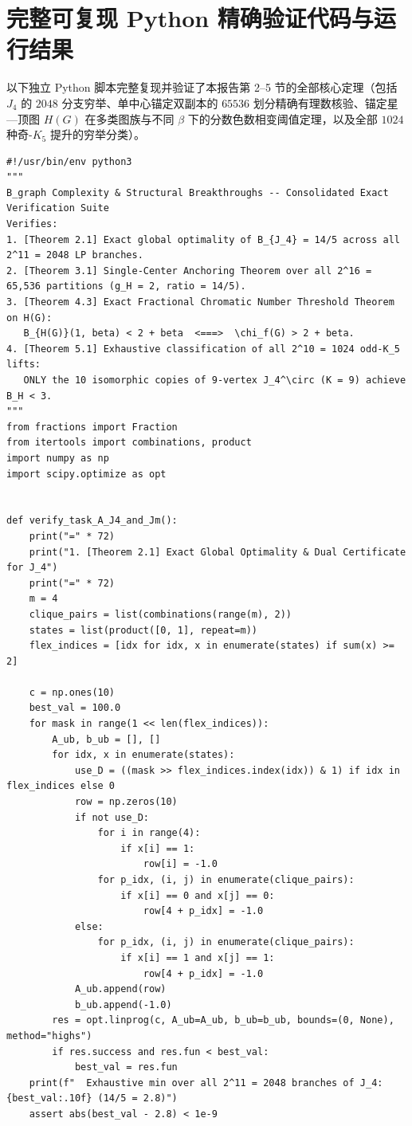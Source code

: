 \documentclass[11pt,a4paper]{ctexart}
\theoremstyle{definition}
\newcommand{\1}{\boldsymbol 1}
\newcommand{\0}{\boldsymbol 0}
\begin{document}
\newpage
\appendix
\section{完整可复现 Python 精确验证代码与运行结果}

以下独立 Python 脚本完整复现并验证了本报告第 2--5 节的全部核心定理（包括 $J_4$ 的 $2048$ 分支穷举、单中心锚定双副本的 $65536$ 划分精确有理数核验、锚定星—顶图 $H(G)$ 在多类图族与不同 $\beta$ 下的分数色数相变阈值定理，以及全部 $1024$ 种奇-$K_5$ 提升的穷举分类）。

\begin{lstlisting}[style=pycode,caption={一般 $B_{\rm graph}$ 核心定理与复杂性归约构件精确复核脚本（\texttt{Bgraph\_breakthrough\_verify.py}）}]
#!/usr/bin/env python3
"""
B_graph Complexity & Structural Breakthroughs -- Consolidated Exact Verification Suite
Verifies:
1. [Theorem 2.1] Exact global optimality of B_{J_4} = 14/5 across all 2^11 = 2048 LP branches.
2. [Theorem 3.1] Single-Center Anchoring Theorem over all 2^16 = 65,536 partitions (g_H = 2, ratio = 14/5).
3. [Theorem 4.3] Exact Fractional Chromatic Number Threshold Theorem on H(G):
   B_{H(G)}(1, beta) < 2 + beta  <===>  \chi_f(G) > 2 + beta.
4. [Theorem 5.1] Exhaustive classification of all 2^10 = 1024 odd-K_5 lifts:
   ONLY the 10 isomorphic copies of 9-vertex J_4^\circ (K = 9) achieve B_H < 3.
"""
from fractions import Fraction
from itertools import combinations, product
import numpy as np
import scipy.optimize as opt


def verify_task_A_J4_and_Jm():
    print("=" * 72)
    print("1. [Theorem 2.1] Exact Global Optimality & Dual Certificate for J_4")
    print("=" * 72)
    m = 4
    clique_pairs = list(combinations(range(m), 2))
    states = list(product([0, 1], repeat=m))
    flex_indices = [idx for idx, x in enumerate(states) if sum(x) >= 2]

    c = np.ones(10)
    best_val = 100.0
    for mask in range(1 << len(flex_indices)):
        A_ub, b_ub = [], []
        for idx, x in enumerate(states):
            use_D = ((mask >> flex_indices.index(idx)) & 1) if idx in flex_indices else 0
            row = np.zeros(10)
            if not use_D:
                for i in range(4):
                    if x[i] == 1:
                        row[i] = -1.0
                for p_idx, (i, j) in enumerate(clique_pairs):
                    if x[i] == 0 and x[j] == 0:
                        row[4 + p_idx] = -1.0
            else:
                for p_idx, (i, j) in enumerate(clique_pairs):
                    if x[i] == 1 and x[j] == 1:
                        row[4 + p_idx] = -1.0
            A_ub.append(row)
            b_ub.append(-1.0)
        res = opt.linprog(c, A_ub=A_ub, b_ub=b_ub, bounds=(0, None), method="highs")
        if res.success and res.fun < best_val:
            best_val = res.fun
    print(f"  Exhaustive min over all 2^11 = 2048 branches of J_4: {best_val:.10f} (14/5 = 2.8)")
    assert abs(best_val - 2.8) < 1e-9



\end{lstlisting}
\end{document}
